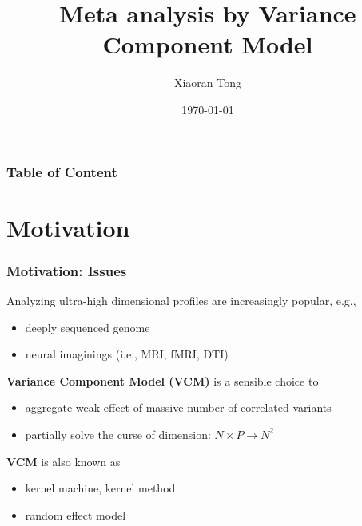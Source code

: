 \documentclass{beamer}
\title[Meta-VCM]{Meta analysis by Variance Component Model}
\author{Xiaoran Tong} %
\institute[EPI Biosta,
MSU] %
{ Michigan State University \\ %
  \medskip \textit{tongxia1@msu.edu} \\%
  \textit{qlu@epi.msu.edu} %
} \date{\today} %
\begin{document}
\begin{frame}
  \titlepage %
\end{frame}

\begin{frame}
  \frametitle{Table of
    Content} %
  \tableofcontents
\end{frame}
\section{Motivation}
\begin{frame}\frametitle{Motivation: Issues}
  Analyzing ultra-high dimensional profiles are increasingly popular,
  e.g.,
  \begin{itemize}
  \item deeply sequenced genome
  \item neural imaginings (i.e., MRI, fMRI, DTI)
  \end{itemize}
  \textbf{Variance Component Model (VCM)} is a sensible choice to
  \begin{itemize}
  \item aggregate weak effect of massive number of correlated variants
  \item partially solve the curse of dimension: $N \times P \to N^2$
  \end{itemize}
  \textbf{VCM} is also known as
  \begin{itemize}
  \item kernel machine, kernel method
  \item random effect model
  \end{itemize}
\end{frame}
\newcommand{\fit}[1]{{\color{magenta}{#1}}}
\newcommand{\CB}[1]{{\color{blue}{#1}}}
\newcommand{\CR}[1]{{\color{red}{#1}}}
\newcommand{\green}[1]{{\color{green}{#1}}}
\end{document}

